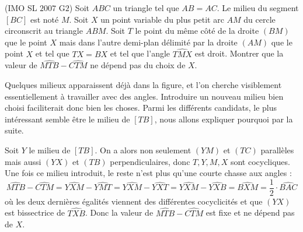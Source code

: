 \begin{exo}
(IMO SL $2007$ G$2$)
Soit $ABC$ un triangle tel que $AB=AC$. Le milieu du segment $[BC]$ est noté $M$. Soit $X$ un point variable du plus petit arc $AM$ du cercle circonscrit au triangle $ABM$. Soit $T$ le point du m\^eme c\^ot\'e de la droite $(BM)$ que le point $X$ mais dans l'autre demi-plan d\'elimit\'e par la droite $(AM)$ que le point $X$ et tel que $TX=BX$ et tel que l'angle $\widehat{TMX}$ est droit. Montrer que la valeur de $\widehat{MTB}-\widehat{CTM}$ ne dépend pas du choix de $X$.
\end{exo}


\begin{sol}
\begin{center}
\end{center}

Quelques milieux apparaissent déjà dans la figure, et l'on cherche visiblement essentiellement à travailler avec des angles. Introduire un nouveau milieu bien choisi faciliterait donc bien les choses. Parmi les différents candidats, le plus intéressant semble être le milieu de $[TB]$, nous allons expliquer pourquoi par la suite.

Soit $Y$ le milieu de $[TB]$. On a alors non seulement $(YM)$ et $(TC)$ parallèles mais aussi $(YX)$ et $(TB)$ perpendiculaires, donc $T,Y,M,X$ sont cocycliques. Une fois ce milieu introduit, le reste n'est plus qu'une courte chasse aux angles :
$$\widehat{MTB}-\widehat{CTM}=\widehat{YXM}-\widehat{YMT}=\widehat{YXM}-\widehat{YXT}=\widehat{YXM}-\widehat{YXB}=\widehat{BXM}=\frac{1}{2}\cdot \widehat{BAC}$$
où les deux dernières égalités viennent des différentes cocyclicités et que $(YX)$ est bissectrice de $\widehat{TXB}$.
Donc la valeur de $\widehat{MTB}-\widehat{CTM}$ est fixe et ne dépend pas de $X$.
\end{sol}


